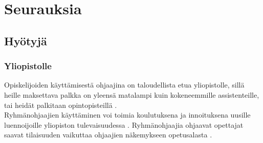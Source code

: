 \documentclass[finnish]{tktltiki2}
\theoremstyle{definition}
\theoremstyle{remark}
\begin{document}
\section{Seurauksia}

\subsection{Hyötyjä}

\subsubsection{Yliopistolle}
Opiskelijoiden käyttämisestä ohjaajina on taloudellista etua yliopistolle, sillä heille maksettava palkka on yleensä matalampi kuin kokeneemmille assistenteille, tai heidät palkitaan opintopisteillä \cite{Reges88}.
\\
Ryhmänohjaajien käyttäminen voi toimia koulutuksena ja innoituksena uusille luennoijoille yliopiston tulevaisuudessa \cite{Roberts95, Morgan02}. Ryhmänohjaajia ohjaavat opettajat saavat tilaisuuden vaikuttaa ohjaajien näkemykseen opetusalasta \cite{Morgan02}. 
\end{document}
